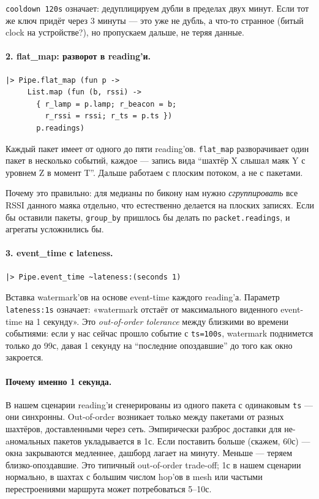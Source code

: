 \texttt{cooldown 120s} означает: дедуплицируем дубли в пределах двух
минут. Если тот же ключ придёт через 3 минуты --- это уже не дубль,
а что-то странное (битый clock на устройстве?), но пропускаем дальше,
не теряя данные.

\paragraph{2. flat\_map: разворот в reading'и.}
\begin{lstlisting}
|> Pipe.flat_map (fun p ->
     List.map (fun (b, rssi) ->
       { r_lamp = p.lamp; r_beacon = b;
         r_rssi = rssi; r_ts = p.ts })
       p.readings)
\end{lstlisting}

Каждый пакет имеет от одного до пяти reading'ов. \texttt{flat\_map}
разворачивает один пакет в несколько событий, каждое --- запись
вида ``шахтёр X слышал маяк Y с уровнем Z в момент T''. Дальше
работаем с плоским потоком, а не с пакетами.

Почему это правильно: для медианы по бикону нам нужно
\emph{сгруппировать} все RSSI данного маяка отдельно, что естественно
делается на плоских записях. Если бы оставили пакеты,
\texttt{group\_by} пришлось бы делать по \texttt{packet.readings}, и
агрегаты усложнились бы.

\paragraph{3. event\_time с lateness.}
\begin{lstlisting}
|> Pipe.event_time ~lateness:(seconds 1)
\end{lstlisting}

Вставка watermark'ов на основе event-time каждого reading'а. Параметр
\texttt{lateness:1s} означает: «watermark отстаёт от максимального
виденного event-time на 1 секунду». Это \emph{out-of-order tolerance}
между близкими во времени событиями: если у нас сейчас прошло событие
с \texttt{ts=100s}, watermark поднимется только до 99с, давая 1
секунду на ``последние опоздавшие'' до того как окно закроется.

\paragraph{Почему именно 1 секунда.} В нашем сценарии reading'и
сгенерированы из одного пакета с одинаковым \texttt{ts} --- они
синхронны. Out-of-order возникает только между пакетами от разных
шахтёров, доставленными через сеть. Эмпирически разброс доставки
для не-aномальных пакетов укладывается в 1с. Если поставить больше
(скажем, 60с) --- окна закрываются медленнее, дашборд лагает на
минуту. Меньше --- теряем близко-опоздавшие. Это типичный
out-of-order trade-off; 1с в нашем сценарии нормально, в шахтах с
большим числом hop'ов в mesh или частыми перестроениями маршрута
может потребоваться 5--10с.

